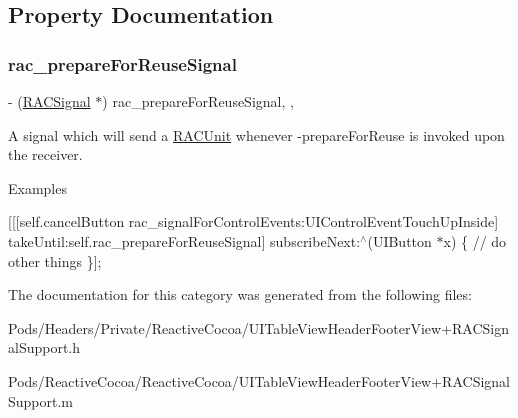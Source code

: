 \subsection{Property Documentation}
\mbox{\label{category_u_i_table_view_header_footer_view_07_r_a_c_signal_support_08_a339cfe7747ba066543fd80771cbadb9e}} 
\subsubsection{\texorpdfstring{rac\+\_\+prepare\+For\+Reuse\+Signal}{rac\_prepareForReuseSignal}}
{\footnotesize\ttfamily -\/ (\mbox{\hyperlink{interface_r_a_c_signal}{R\+A\+C\+Signal}} $\ast$) rac\+\_\+prepare\+For\+Reuse\+Signal\hspace{0.3cm}{\ttfamily [read]}, {\ttfamily [nonatomic]}, {\ttfamily [strong]}}

A signal which will send a \mbox{\hyperlink{interface_r_a_c_unit}{R\+A\+C\+Unit}} whenever -\/prepare\+For\+Reuse is invoked upon the receiver.

Examples

\mbox{[}\mbox{[}\mbox{[}self.\+cancel\+Button rac\+\_\+signal\+For\+Control\+Events\+:U\+I\+Control\+Event\+Touch\+Up\+Inside\mbox{]} take\+Until\+:self.\+rac\+\_\+prepare\+For\+Reuse\+Signal\mbox{]} subscribe\+Next\+:$^\wedge$(U\+I\+Button $\ast$x) \{ // do other things \}\mbox{]}; 

The documentation for this category was generated from the following files\+:\begin{DoxyCompactItemize}
\item 
Pods/\+Headers/\+Private/\+Reactive\+Cocoa/U\+I\+Table\+View\+Header\+Footer\+View+\+R\+A\+C\+Signal\+Support.\+h\item 
Pods/\+Reactive\+Cocoa/\+Reactive\+Cocoa/U\+I\+Table\+View\+Header\+Footer\+View+\+R\+A\+C\+Signal\+Support.\+m\end{DoxyCompactItemize}

